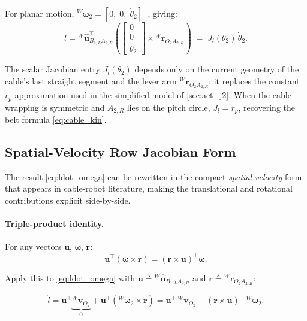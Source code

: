 \documentclass[12pt, a4paper]{article}
\theoremstyle{definition}
\begin{document}
For planar motion, ${}^{W}\boldsymbol{\omega}_2 = [0,\;0,\;\dot{\theta}_2]^\top$,
giving:
\begin{equation}
  \label{eq:ldot_planar}
  \boxed{
    \dot{l}
    = {}^{W}\hat{\mathbf{u}}_{B_{1,L}A_{2,R}}^\top
      \left(
        \begin{bmatrix} 0 \\ 0 \\ \dot{\theta}_2 \end{bmatrix}
        \times
        {}^{W}\mathbf{r}_{O_2 A_{2,R}}
      \right)
    \;=\;
    J_l(\theta_2)\,\dot{\theta}_2 .
  }
\end{equation}

The scalar Jacobian entry $J_l(\theta_2)$ depends only on the current geometry of
the cable's last straight segment and the lever arm ${}^{W}\mathbf{r}_{O_2 A_{2,R}}$;
it replaces the constant $r_p$ approximation used in the simplified model of
\cref{sec:act_j2}.  When the cable wrapping is symmetric and $A_{2,R}$ lies on
the pitch circle, $J_l = r_p$, recovering the belt formula \cref{eq:cable_kin}.

\subsection{Spatial-Velocity Row Jacobian Form}
\label{sec:spatial_jac}

The result \cref{eq:ldot_omega} can be rewritten in the compact \emph{spatial velocity}
form that appears in cable-robot literature, making the translational and rotational
contributions explicit side-by-side.

\paragraph{Triple-product identity.}
For any vectors $\mathbf{u}$, $\boldsymbol{\omega}$, $\mathbf{r}$:
\begin{equation}
  \label{eq:triple}
  \mathbf{u}^\top(\boldsymbol{\omega} \times \mathbf{r})
  = (\mathbf{r} \times \mathbf{u})^\top \boldsymbol{\omega}.
\end{equation}

Apply this to \cref{eq:ldot_omega} with
$\mathbf{u} \triangleq {}^{W}\hat{\mathbf{u}}_{B_{1,L}A_{2,R}}$ and
$\mathbf{r} \triangleq {}^{W}\mathbf{r}_{O_2 A_{2,R}}$:

\begin{equation}
  \dot{l}
  = \mathbf{u}^\top \underbrace{{}^{W}\mathbf{v}_{O_2}}_{\mathbf{0}}
  + \mathbf{u}^\top({}^{W}\boldsymbol{\omega}_2 \times \mathbf{r})
  = \mathbf{u}^\top\,{}^{W}\mathbf{v}_{O_2}
  + (\mathbf{r} \times \mathbf{u})^\top\,{}^{W}\boldsymbol{\omega}_2 .
\end{equation}
\end{document}
